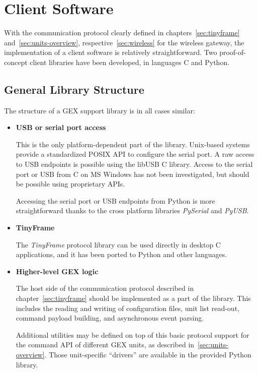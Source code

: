\chapter{Client Software}

With the communication protocol clearly defined in chapters~\ref{sec:tinyframe} and~\ref{sec:units-overview}, respective~\ref{sec:wireless} for the wireless gateway, the implementation of a client software is relatively straightforward. Two proof-of-concept client libraries have been developed, in languages C and Python.

\section{General Library Structure}

The structure of a GEX support library is in all cases similar:

\begin{itemize}
	\item \textbf{USB or serial port access}

		This is the only platform-dependent part of the library. Unix-based systems provide a standardized POSIX API to configure the serial port. A raw access to \gls{USB} endpoints is possible using the libUSB C library. Access to the serial port or \gls{USB} from C on MS Windows has not been investigated, but should be possible using proprietary APIs.

		Accessing the serial port or \gls{USB} endpoints from Python is more straightforward thanks to the cross platform libraries \textit{PySerial} and \textit{PyUSB}.

	\item \textbf{TinyFrame}

		The \textit{TinyFrame} protocol library can be used directly in desktop C applications, and it has been ported to Python and other languages.

	\item \textbf{Higher-level GEX logic}

		The host side of the communication protocol described in chapter~\ref{sec:tinyframe} should be implemented as a part of the library. This includes the reading and writing of configuration files, unit list read-out, command payload building, and asynchronous event parsing.

		Additional utilities may be defined on top of this basic protocol support for the command API of different GEX units, as described in~\ref{sec:units-overview}. Those unit-specific ``drivers'' are available in the provided Python library.
\end{itemize}

